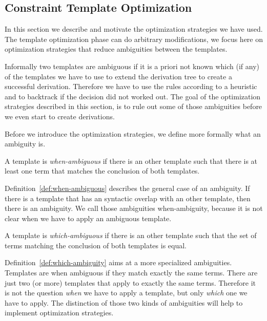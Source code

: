 \subsection{Constraint Template Optimization}
\label{sec:constr-templ-optim}
In this section we describe and motivate the optimization strategies
we have used. The template optimization phase can do arbitrary
modifications, we focus here on optimization strategies that reduce
ambiguities between the templates.

Informally two templates are ambiguous if it is a priori not known
which (if any) of the templates we have to use to extend the
derivation tree to create a successful derivation. Therefore we have
to use the rules according to a heuristic and to backtrack if the
decision did not worked out. The goal of the optimization strategies
described in this section, is to rule out some of those ambiguities
before we even start to create derivations.

Before we introduce the optimization strategies, we define more
formally what an ambiguity is.

\begin{definition}
  A template is \textit{when-ambiguous} if there is an other
  template such that there is at least one term that matches the
  conclusion of both templates.
\label{def:when-ambiguous}
\end{definition}

Definition~\ref{def:when-ambiguous} describes the general case of an
ambiguity. If there is a template that has an syntactic overlap with
an other template, then there is an ambiguity. We call those
ambiguities when-ambiguity, because it is not clear when we have to
apply an ambiguous template. 

\begin{definition}
  A template is \textit{which-ambiguous} if there is an other template
  such that the set of terms matching the conclusion of both templates
  is equal.
\label{def:which-ambiguity}
\end{definition}

Definition~\ref{def:which-ambiguity} aims at a more specialized
ambiguities. Templates are when ambiguous if they match exactly the
same terms. There are just two (or more) templates that apply to
exactly the same terms. Therefore it is not the question \textit{when}
we have to apply a template, but only \textit{which} one we have to
apply. The distinction of those two kinds of ambiguities will help to
implement optimization strategies.

